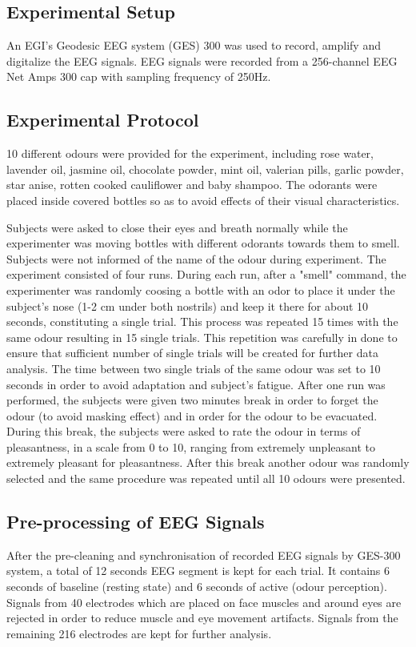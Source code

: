 \documentclass[conference]{IEEEtran}
\begin{document}
\subsection{Experimental Setup}
An EGI's Geodesic EEG system (GES) 300 was used to record, amplify and digitalize the EEG signals. EEG signals were recorded from a 256-channel EEG Net Amps 300 cap with sampling frequency of 250Hz.  
\subsection{Experimental Protocol}
10 different odours were provided for the experiment, including rose water, lavender oil, jasmine oil, chocolate powder, mint oil, valerian pills, garlic powder, star anise, rotten cooked cauliflower and baby shampoo. The odorants were placed inside covered bottles so as to avoid effects of their visual characteristics.  

Subjects were asked to close their eyes and breath normally while the experimenter was moving bottles with different odorants towards them to smell. Subjects were not informed of the name of the odour during experiment. The experiment consisted of four runs. During each run, after a "smell" command, the experimenter was randomly coosing a bottle with an odor to place it under the subject's nose (1-2 cm under both nostrils) and keep it there for about 10 seconds, constituting a single trial. This process was repeated 15 times with the same odour resulting in 15 single trials. This repetition was carefully in done to ensure that sufficient number of single trials will be created for further data analysis. The time between two single trials of the same odour was set to 10 seconds in order to avoid adaptation and subject's fatigue. After one run was performed, the subjects were given two minutes break in order to forget the odour (to avoid masking effect) and in order for the odour to be evacuated. During this break, the subjects were asked to rate the odour in terms of pleasantness, in a scale from 0 to 10, ranging from extremely unpleasant to extremely pleasant for pleasantness. After this break another odour was randomly selected and the same procedure was repeated until all 10 odours were presented.    

\subsection{Pre-processing of EEG Signals}
After the pre-cleaning and synchronisation of recorded EEG signals by GES-300 system, a total of 12 seconds EEG segment is kept for each trial. It contains 6 seconds of baseline (resting state) and 6 seconds of active (odour perception). Signals from 40 electrodes which are placed on face muscles and around eyes are rejected in order to reduce muscle and eye movement artifacts. Signals from the remaining 216 electrodes are kept for further analysis. 
\end{document}
